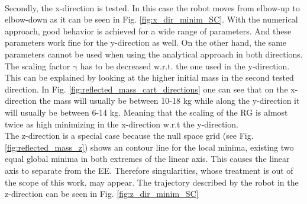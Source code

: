 %
%
\\ Secondly, the x-direction is tested. In this case the robot moves from elbow-up to elbow-down as it can be seen in Fig. \ref{fig:x_dir_minim_SC}.  With the numerical approach, good behavior is achieved for a wide range of parameters. And these parameters  work fine for the y-direction as well. On the other hand, the same parameters cannot be used when using the analytical approach in both directions. The scaling factor $\mathrm{\gamma}$ has to be decreased w.r.t. the one used in the y-direction. This can be explained by looking at the higher initial mass in the second tested direction. In  Fig. \ref{fig:reflected_mass_cart_directions}  one can see that on the x-direction the mass will usually be between 10-18 kg while along the y-direction it will usually be between 6-14 kg. Meaning that the scaling of the RG is almost twice as high minimizing in the x-direction w.r.t the y-direction.  
\\
%
The z-direction is a special case because the null space grid (see Fig. \ref{fig:reflected_mass_z}) shows an contour line for the local minima, existing two equal global minima in both extremes of the linear axis. This causes the linear axis to separate from the EE. Therefore singularities, whose treatment is out of the scope of this work, may appear. %
The trajectory described by the robot in the z-direction can be seen in Fig. \ref{fig:z_dir_minim_SC}




